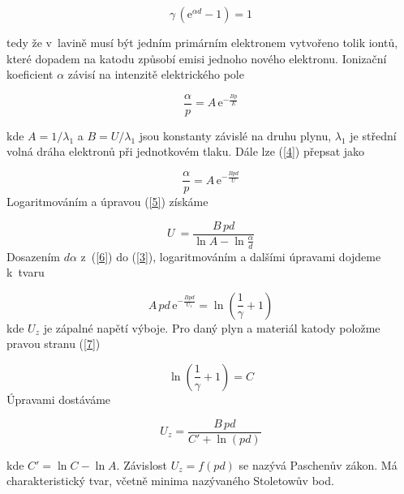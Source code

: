 \documentclass[a4paper,12pt]{article}
\newcommand{\e}{\text{e}}
\begin{document}
\begin{equation}
	\gamma\,(\e^{\alpha d } - 1) = 1
	\label{3}
\end{equation} 

tedy že v~lavině musí být jedním primárním elektronem vytvořeno tolik iontů, které dopadem na katodu způsobí emisi jednoho nového elektronu. Ionizační koeficient $\alpha$ závisí na intenzitě elektrického pole 

\begin{equation}
	\frac{\alpha}{p} = A\,\e^{-\frac{Bp}{E}} 
	\label{4}
\end{equation}

kde $A = 1/\lambda_1$ a $B = U/\lambda_1$ jsou konstanty závislé na druhu plynu, $\lambda_1$ je střední volná dráha elektronů při jednotkovém tlaku. Dále lze (\ref{4}) přepsat jako

\begin{equation}
	\frac{\alpha}{p} = A\,\e^{-\frac{Bpd}{U}} 
	\label{5}
\end{equation}
Logaritmováním a úpravou (\ref{5}) získáme

\begin{equation}
	U~= \frac{B\,pd}{\ln A - \ln \frac{\alpha}{d}}
	\label{6}
\end{equation}
Dosazením $d\alpha$ z~(\ref{6}) do (\ref{3}), logaritmováním a dalšími úpravami 
dojdeme k~tvaru

\begin{equation}
	A\,pd\,\e^{-\frac{Bpd}{U_z}} = \ln \left(\frac{1}{\gamma} + 1\right)
	\label{7}
\end{equation}
kde $U_z$ je zápalné napětí výboje. Pro daný plyn a materiál katody položme pravou stranu (\ref{7})

\begin{equation}
	\ln \left(\frac{1}{\gamma} + 1\right) = C
	\label{8}
\end{equation}
Úpravami dostáváme

\begin{equation}
	U_z = \frac{B\,pd}{C' + \ln(pd)}
	\label{9}
\end{equation}

kde $C' = \ln C - \ln A$. Závislost $U_z = f (pd)$ se nazývá Paschenův zákon. 
Má charakteristický tvar, včetně minima nazývaného Stoletowův bod.
\end{document}
